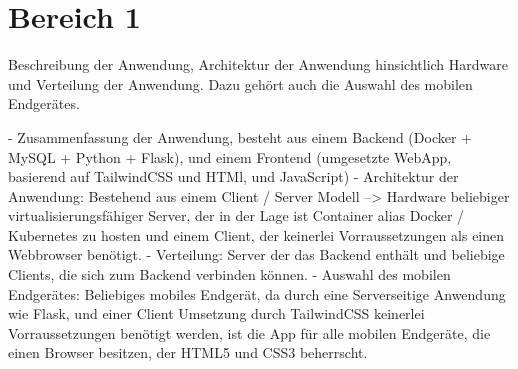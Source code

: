 \section{Bereich 1}
Beschreibung der Anwendung, Architektur der Anwendung hinsichtlich Hardware und Verteilung der Anwendung.
Dazu gehört auch die Auswahl des mobilen Endgerätes.

- Zusammenfassung der Anwendung, besteht aus einem Backend (Docker + MySQL + Python + Flask), und einem Frontend (umgesetzte WebApp, basierend auf TailwindCSS und HTMl, und JavaScript)
- Architektur der Anwendung: Bestehend aus einem Client / Server Modell --> Hardware beliebiger virtualisierungsfähiger Server, der in der Lage ist Container alias Docker / Kubernetes  zu hosten und einem Client, der keinerlei Vorraussetzungen als einen Webbrowser benötigt.
- Verteilung: Server der das Backend enthält und beliebige Clients, die sich zum Backend verbinden können.
- Auswahl des mobilen Endgerätes: Beliebiges mobiles Endgerät, da durch eine Serverseitige Anwendung wie Flask, und einer Client Umsetzung durch TailwindCSS keinerlei Vorraussetzungen benötigt werden, ist die App für alle mobilen Endgeräte, die einen Browser besitzen, der HTML5 und CSS3 beherrscht.